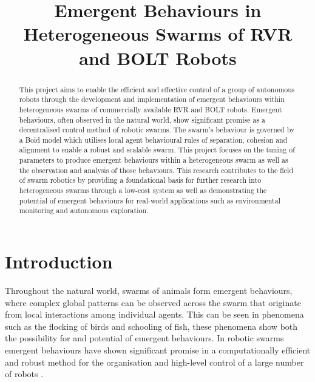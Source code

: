 \documentclass[conference]{IEEEtran}
\begin{document}
\title{Emergent Behaviours in Heterogeneous Swarms of RVR and BOLT Robots}

\author{
}

\maketitle

\begin{abstract}
This project aims to enable the efficient and effective control of a group of autonomous robots through the development and implementation of emergent behaviours within heterogeneous swarms of commercially available RVR and BOLT robots. Emergent behaviours, often observed in the natural world, show significant promise as a decentralised control method of robotic swarms. The swarm's behaviour is governed by a Boid model which utilises local agent behavioural rules of separation, cohesion and alignment to enable a robust and scalable swarm. This project focuses on the tuning of parameters to produce emergent behaviours within a heterogeneous swarm as well as the observation and analysis of those behaviours. This research contributes to the field of swarm robotics by providing a foundational basis for further research into heterogeneous swarms through a low-cost system as well as demonstrating the potential of emergent behaviours for real-world applications such as environmental monitoring and autonomous exploration.     
\end{abstract}

\section{Introduction}

Throughout the natural world, swarms of animals form emergent behaviours, where complex global patterns can be observed across the swarm that originate from local interactions among individual agents. This can be seen in phenomena such as the flocking of birds and schooling of fish, these phenomena show both the possibility for and potential of emergent behaviours. In robotic swarms emergent behaviours have shown significant promise in a computationally efficient and robust method for the organisation and high-level control of a large number of robots \cite{sahin_swarm_2005}.
\end{document}
